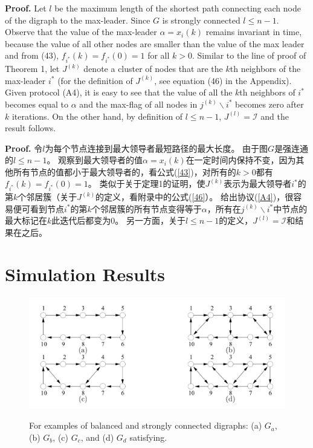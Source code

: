 \documentclass{article}
\begin{document}
{\color[gray]{0.5}
\noindent\textbf{Proof.} Let $l$ be the maximum length of the shortest path connecting each node of the digraph to the max-leader. 
Since $G$ is strongly connected $l\le n-1$. 
Observe that the value of the max-leader $\alpha=x_i(k)$ remains invariant in time, because the value of all other nodes are smaller than the value of the max leader and from (43), $f_{i^*}(k)=f_{i^*}(0)=1$ for all $k > 0$. 
Similar to the line of proof of Theorem 1, let $J^{(k)}$ denote a cluster of nodes that are the $k$th neighbors of the max-leader $i^*$ (for the deﬁnition of $J^{(k)}$, see equation (46) in the Appendix). 
Given protocol (A4), it is easy to see that the value of all the $k$th neighbors of $i^*$ becomes equal to $\alpha$ and the max-ﬂag of all nodes in $j^{(k)}\backslash {i^*}$ becomes zero after $k$ iterations. 
On the other hand, by deﬁnition of $l\le n-1$, $J^{(l)}=\mathcal{I}$ and the result follows.
}

\noindent\textbf{Proof.} 令$l$为每个节点连接到最大领导者最短路径的最大长度。
由于图$G$是强连通的$l\le n-1$。
观察到最大领导者的值$\alpha=x_i(k)$在一定时间内保持不变，因为其他所有节点的值都小于最大领导者的，看公式(\ref{43})，对所有的$k>0$都有$f_{i^*}(k)=f_{i^*}(0)=1$。
类似于关于定理1的证明，使$J^{(k)}$表示为最大领导者$i^*$的第$k$个邻居簇（关于$J^{(k)}$的定义，看附录中的公式(\ref{46}）。
给出协议(\ref{A4})，很容易便可看到节点$i^*$的第$k$个邻居簇的所有节点变得等于$\alpha$，所有在$j^{(k)}\backslash {i^*}$中节点的最大标记在$k$此迭代后都变为0。
另一方面，关于$l\le n-1$的定义，$J^{(l)}=\mathcal{I}$和结果在之后。

\section{Simulation Results}
\begin{figure}[htbp]
    \centering
    \includegraphics[width=12cm]{figures/Fig4-BalancedSC.jpeg}
    \label{Fig4}
    \caption{For examples of balanced and strongly connected digraphs: (a) $G_a$, (b) $G_b$, (c) $G_c$, and (d) $G_d$ satisfying.}
\end{figure}
\end{document}
